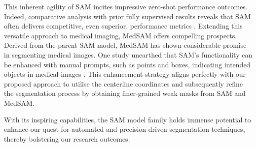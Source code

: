This inherent agility of SAM incites impressive zero-shot performance outcomes. Indeed, comparative analysis with prior fully supervised results reveals that SAM often delivers competitive, even superior, performance metrics \cite{kirillov2023segany}. Extending this versatile approach to medical imaging, MedSAM \cite{MedSAM} offers compelling prospects. Derived from the parent SAM model, MedSAM has shown considerable promise in segmenting medical images. One study unearthed that SAM's functionality can be enhanced with manual prompts, such as points and boxes, indicating intended objects in medical images \cite{huang2023segment}. This enhancement strategy aligns perfectly with our proposed approach to utilise the centerline coordinates and subsequently refine the segmentation process by obtaining finer-grained weak masks from SAM and MedSAM.

With its inspiring capabilities, the SAM model family holds immense potential to enhance our quest for automated and precision-driven segmentation techniques, thereby bolstering our research outcomes.












